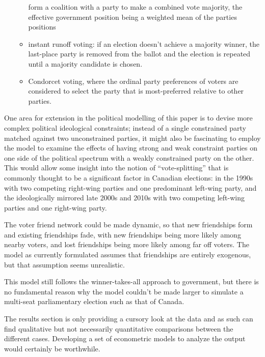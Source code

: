\documentclass[12pt]{article}
\numberwithin{equation}{subsection}
\begin{document}
\begin{itemize}
\begin{itemize}
                form a coalition with a party to make a combined vote majority, the
                effective government position being a weighted mean of the parties positions
            \item 
                instant runoff voting: if an election doesn't achieve a majority winner, the
                last-place party is removed from the ballot and the election is repeated
                until a majority candidate is chosen.
            \item
                Condorcet voting, where the ordinal party preferences of voters are
                considered to select the party that is most-preferred relative to other
                parties.
        \end{itemize}

\end{itemize}

One area for extension in the political modelling of this paper is to devise more complex political
ideological constraints; instead of a single constrained party matched against two unconstrained
parties, it might also be fascinating to employ the model to examine the effects of having strong
and weak constraint parties on one side of the political spectrum with a weakly constrained party on
the other.  This would allow some insight into the notion of ``vote-splitting'' that is commonly
thought to be a significant factor in Canadian elections: in the 1990s with two competing right-wing
parties and one predominant left-wing party, and the ideologically mirrored late 2000s and 2010s
with two competing left-wing parties and one right-wing party.

The voter friend network could be made dynamic, so that new friendships form and existing
friendships fade, with new friendships being more likely among nearby voters, and lost
friendships being more likely among far off voters.  The model as currently formulated
assumes that friendships are entirely exogenous, but that assumption seems unrealistic.

This model still follows the winner-takes-all approach to government, but there is no fundamental
reason why the model couldn't be made larger to simulate a multi-seat parliamentary election such as
that of Canada.

The results section is only providing a cursory look at the data and as such can find qualitative
but not necessarily quantitative comparisons between the different cases.  Developing a set of
econometric models to analyze the output would certainly be worthwhile.
\end{document}
